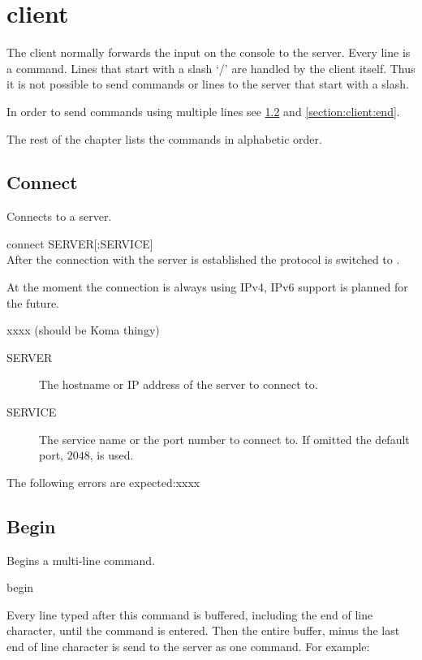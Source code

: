 \chapter{client}
\label{chapter:client}

The client normally forwards the input on the console to the server. Every
line is a command. Lines that start with a slash `/' are handled by the
client itself. Thus it is not possible to send commands or lines to the
server that start with a slash.

In order to send commands using multiple lines see
\cref{section:client:begin} and \cref{section:client:end}.

The rest of the chapter lists the commands in alphabetic order.



\section{Connect}
\label{section:client:connect}

Connects to a server.

\indent connect SERVER[:SERVICE]\\

After the connection with the server is established the protocol is switched
to .

At the moment the connection is always using IPv4, IPv6 support is planned
for the future.


xxxx (should be Koma thingy)
\begin{description}
\item[SERVER]
	The hostname or IP address of the server to connect to.

\item[SERVICE]
	The service name or the port number to connect to. If omitted the
	default port, $2048$, is used.

\end{description}

The following errors are expected:xxxx


\section{Begin}
\label{section:client:begin}

Begins a multi-line command.

\indent begin

Every line typed after this command is buffered, including the end of line
character,  until the  command is entered. Then
the entire buffer, minus the last end of line character is send to the
server as one command. For example:

